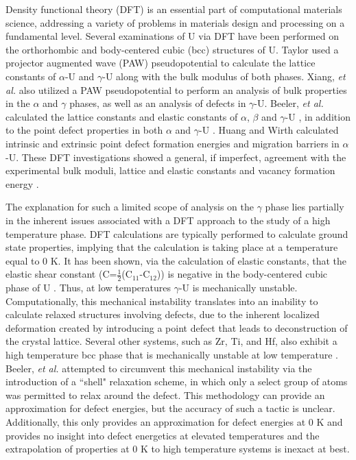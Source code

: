 \documentclass[review]{elsarticle}
\begin{document}
Density functional theory (DFT) is an essential part of computational materials science, addressing a variety of problems in materials design and processing on a fundamental level. Several examinations of U via DFT have been performed on the orthorhombic and body-centered cubic (bcc) structures of U. Taylor \cite{taylor2008} used a projector augmented wave (PAW) pseudopotential to calculate the lattice constants of $\alpha$-U and $\gamma$-U along with the bulk modulus of both phases. Xiang, \textit{et al.} \cite{xiang2008} also utilized a PAW pseudopotential to perform an analysis of bulk properties in the $\alpha$ and $\gamma$ phases, as well as an analysis of defects in $\gamma$-U.  Beeler, \textit{et al.} calculated the lattice constants and elastic constants of $\alpha$, $\beta$ and $\gamma$-U \cite{beeler2013}, in addition to the point defect properties in both $\alpha$ and $\gamma$-U \cite{beeler2010}. Huang and Wirth \cite{wirth2011, wirth2012} calculated intrinsic and extrinsic point defect formation energies and migration barriers in $\alpha$-U. These DFT investigations showed a general, if imperfect, agreement with the experimental bulk moduli, lattice and elastic constants and vacancy formation energy \cite{yoo1998, barrett1963, matter1980}. 

The explanation for such a limited scope of analysis on the $\gamma$ phase lies partially in the inherent issues associated with a DFT approach to the study of a high temperature phase. DFT calculations are typically performed to calculate ground state properties, implying that the calculation is taking place at a temperature equal to 0 K. It has been shown, via the calculation of elastic constants, that the elastic shear constant (C\textprime=$\frac{1}{2}$(C$_{11}$-C$_{12}$)) is negative in the body-centered cubic phase of U \cite{soderlind1998, beeler2013}. Thus, at low temperatures $\gamma$-U is mechanically unstable. Computationally, this mechanical instability translates into an inability to calculate relaxed structures involving defects, due to the inherent localized deformation created by introducing a point defect that leads to deconstruction of the crystal lattice. Several other systems, such as Zr, Ti, and Hf, also exhibit a high temperature bcc phase that is mechanically unstable at low temperature \cite{sanchez1975, ye1987}. Beeler, \textit{et al.} \cite{beeler2010} attempted to circumvent this mechanical instability via the introduction of a ``shell" relaxation scheme, in which only a select group of atoms was permitted to relax around the defect. This methodology can provide an approximation for defect energies, but the accuracy of such a tactic is unclear. Additionally, this only provides an approximation for defect energies at 0 K and provides no insight into defect energetics at elevated temperatures and the extrapolation of properties at 0 K to high temperature systems is inexact at best.  
\end{document}
